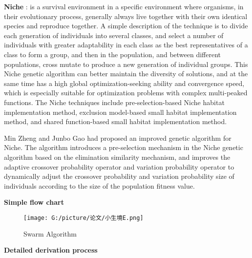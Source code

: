 \documentclass[twocolumn]{article}
\begin{document}
\textbf{Niche} : is a survival environment in a specific environment
where organisms, in their evolutionary process, generally always live
together with their own identical species and reproduce together. A
simple description of the technique is to divide each generation of
individuals into several classes, and select a number of individuals
with greater adaptability in each class as the best representatives of a
class to form a group, and then in the population, and between different
populations, cross mutate to produce a new generation of individual
groups. This Niche genetic algorithm can better maintain the diversity
of solutions, and at the same time has a high global
optimization-seeking ability and convergence speed, which is especially
suitable for optimization problems with complex multi-peaked functions.
The Niche techniques include pre-selection-based Niche habitat
implementation method, exclusion model-based small habitat
implementation method, and shared function-based small habitat
implementation method.

Min Zheng and Junbo Gao had proposed an improved genetic algorithm for
Niche. The algorithm introduces a pre-selection mechanism in the Niche
genetic algorithm based on the elimination similarity mechanism, and
improves the adaptive crossover probability operator and variation
probability operator to dynamically adjust the crossover probability and
variation probability size of individuals according to the size of the
population fitness value.

\textbf{Simple flow chart}

\begin{figure}
	\centering
	\texttt{[image: G:/picture/论文/小生境E.png]}
	\caption{Swarm Algorithm}
\end{figure}

\textbf{Detailed derivation process}
\end{document}
